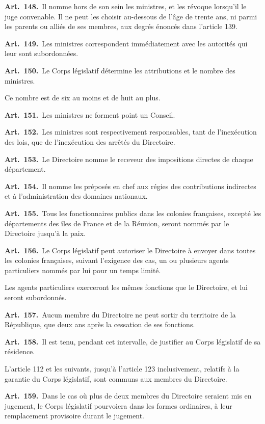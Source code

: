 \documentclass[french,twoside]{book} %
\newcommand{\labelchar}[1]{\textbf{\color{rubric} #1}}
\begin{document}
\labelchar{Art. 148.} Il nomme hors de son sein les ministres, et les révoque lorsqu’il le juge convenable. Il ne peut les choisir au-dessous de l’âge de trente ans, ni parmi les parents ou alliés de ses membres, aux degrés énoncés dans l’article 139.\par
\labelchar{Art. 149.} Les ministres correspondent immédiatement avec les autorités qui leur sont subordonnées.\par
\labelchar{Art. 150.} Le Corps législatif détermine les attributions et le nombre des ministres.\par
Ce nombre est de six au moins et de huit au plus.\par
\labelchar{Art. 151.} Les ministres ne forment point un Conseil.\par
\labelchar{Art. 152.} Les ministres sont respectivement responsables, tant de l’inexécution des lois, que de l’inexécution des arrêtés du Directoire.\par
\labelchar{Art. 153.} Le Directoire nomme le receveur des impositions directes de chaque département.\par
\labelchar{Art. 154.} Il nomme les préposés en chef aux régies des contributions indirectes et à l’administration des domaines nationaux.\par
\labelchar{Art. 155.} Tous les fonctionnaires publics dans les colonies françaises, excepté les départements des îles de France et de la Réunion, seront nommés par le Directoire jusqu’à la paix.\par
\labelchar{Art. 156.} Le Corps législatif peut autoriser le Directoire à envoyer dans toutes les colonies françaises, suivant l’exigence des cas, un ou plusieurs agents particuliers nommés par lui pour un temps limité.\par
Les agents particuliers exerceront les mêmes fonctions que le Directoire, et lui seront subordonnés.\par
\labelchar{Art. 157.} Aucun membre du Directoire ne peut sortir du territoire de la République, que deux ans après la cessation de ses fonctions.\par
\labelchar{Art. 158.} Il est tenu, pendant cet intervalle, de justifier au Corps législatif de sa résidence.\par
L’article 112 et les suivants, jusqu’à l’article 123 inclusivement, relatifs à la garantie du Corps législatif, sont communs aux membres du Directoire.\par
\labelchar{Art. 159.} Dans le cas où plus de deux membres du Directoire seraient mis en jugement, le Corps législatif pourvoiera dans les formes ordinaires, à leur remplacement provisoire durant le jugement.\par
\end{document}

